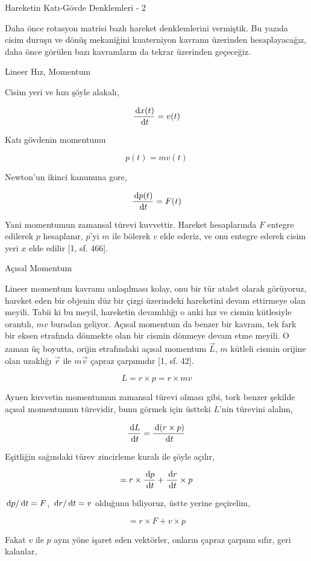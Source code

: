 \documentclass[12pt,fleqn]{article}\usepackage{../../common}
\begin{document}
Hareketin Katı-Gövde Denklemleri - 2

Daha önce rotasyon matrisi bazlı hareket denklemlerini vermiştik. Bu yazıda
cisim duruşu ve dönüş mekaniğini kuaterniyon kavramı üzerinden hesaplayacağız,
daha önce görülen bazı kavramların da tekrar üzerinden geçeceğiz.

Lineer Hız, Momentum

Cisim yeri ve hızı şöyle alakalı,

$$
\frac{\,\mathrm{d} x(t)}{\,\mathrm{d} t} = v(t)
$$

Katı gövdenin momentumu

$$
p(t) = m v(t)
$$

Newton'un ikinci kanununa gore,

$$
\frac{\,\mathrm{d} p(t)}{\,\mathrm{d} t} = F(t)
$$

Yani momentumun zamansal türevi kuvvettir. Hareket hesaplarında $F$ entegre
edilerek $p$ hesaplanır, $p$'yi $m$ ile bölerek $v$ elde ederiz, ve onu entegre
ederek cisim yeri $x$ elde edilir [1, sf. 466].

Açısal Momentum

Lineer momentum kavramı anlaşılması kolay, onu bir tür atalet olarak görüyoruz,
hareket eden bir objenin düz bir çizgi üzerindeki hareketini devam ettirmeye
olan meyili. Tabii ki bu meyil, hareketin devamlılığı o anki hız ve cismin
kütlesiyle orantılı, $mv$ buradan geliyor. Açısal momentum da benzer bir kavram,
tek fark bir eksen etrafında dönmekte olan bir cismin dönmeye devam etme meyili.
O zaman üç boyutta, orijin etrafındaki açısal momentum $\vec{L}$, $m$ kütleli
cismin orijine olan uzaklığı $\vec{r}$ ile $m\vec{v}$ çapraz çarpımıdır [1, sf. 42].

$$
L = r \times p = r \times mv
$$

Aynen kuvvetin momentumun zamansal türevi olması gibi, tork benzer şekilde
açısal momentumun türevidir, bunu görmek için üstteki $L$'nin türevini alalım,

$$
\frac{\,\mathrm{d} L}{\,\mathrm{d} t} = \frac{\,\mathrm{d} (r \times p)}{\,\mathrm{d} t}
$$

Eşitliğin sağındaki türev zincirleme kuralı ile şöyle açılır,

$$
= r \times \frac{\,\mathrm{d} p}{\,\mathrm{d} t} + \frac{\,\mathrm{d} r}{\,\mathrm{d} t} \times p
$$

$\,\mathrm{d} p / \,\mathrm{d} t = F$, $\,\mathrm{d} r / \,\mathrm{d} t = v$ olduğunu biliyoruz, üstte yerine
geçirelim,

$$
= r \times F + v \times p
$$

Fakat $v$ ile $p$ aynı yöne işaret eden vektörler, onların çapraz çarpımı sıfır,
geri kalanlar,
\end{document}
